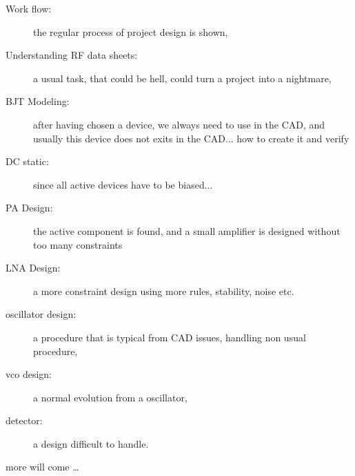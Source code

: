 \begin{description}
\item[Work flow: ] the regular process of project design is shown,

\item[Understanding RF data sheets: ] a usual task, that could be
hell, could turn a project into a nightmare,

\item[BJT Modeling: ] after having chosen a device, we always need to
use in the CAD, and usually this device does not exits in the
CAD... how to create it and verify

\item[DC static: ] since all active devices have to be biased...

\item[PA Design: ] the active component is found, and a small
amplifier is designed without too many constraints

\item[LNA Design: ] a more constraint design using more rules,
stability, noise etc.

\item[oscillator design: ] a procedure that is typical from CAD
issues, handling non usual procedure,

\item[vco design: ] a normal evolution from a oscillator,

\item[detector: ] a design difficult to handle.

\item[more will come \ldots]

\end{description}
